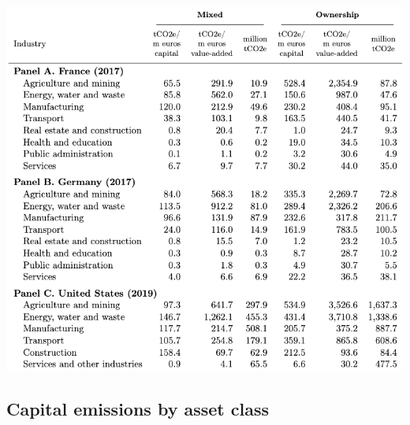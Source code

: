 \documentclass[10pt]{beamer}
\begin{document}
\begin{frame}{\subsecname}
    \begin{center}
        \includegraphics[height=0.9\textheight]{../Figures/T1.png}    
    \end{center}
\end{frame}

\subsection{Capital emissions by asset class}
\end{document}
